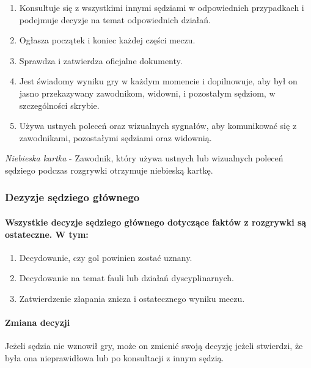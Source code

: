 \documentclass[12pt]{article}
\begin{document}
\begin{enumerate}
\item Konsultuje się z wszystkimi innymi sędziami w odpowiednich
przypadkach i podejmuje decyzje na temat odpowiednich działań.

\item Ogłasza początek i koniec każdej części meczu.

\item Sprawdza i zatwierdza oficjalne dokumenty.

\item Jest świadomy wyniku gry w każdym momencie i dopilnowuje, aby był on
jasno przekazywany zawodnikom, widowni, i pozostałym sędziom, w
szczególności skrybie.

\item Używa ustnych poleceń oraz wizualnych sygnałów, aby komunikować się z
zawodnikami, pozostałymi sędziami oraz widownią.
\end{enumerate}

\emph{Niebieska kartka} - Zawodnik, który używa ustnych lub wizualnych
poleceń sędziego podczas rozgrywki otrzymuje niebieską kartkę.

\subsubsection{Dezyzje sędziego głównego}

\paragraph{Wszystkie decyzje sędziego głównego dotyczące faktów z
rozgrywki są ostateczne. W tym:}
\begin{enumerate}
\item Decydowanie, czy gol powinien zostać uznany.

\item Decydowanie na temat fauli lub działań dyscyplinarnych.

\item Zatwierdzenie złapania znicza i ostatecznego wyniku meczu.
\end{enumerate}

\paragraph{Zmiana decyzji}
Jeżeli sędzia nie wznowił gry, może
on zmienić swoją decyzję jeżeli stwierdzi, że była ona nieprawidłowa lub
po konsultacji z innym sędzią.
\end{document}

